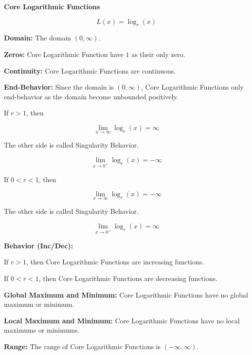 \documentclass{ximera}
\begin{document}
\begin{explanation} \textbf{\textcolor{red!75!green}{Core Logarithmic Functions}} 


\[ L(x) = \log_r(x)  \]



\textbf{Domain:} The domain $(0, \infty)$.

\textbf{Zeros:} Core Logarithmic Function have $1$ as their only zero.



\textbf{Continuity:} Core Logarithmic Functions are continuous.



\textbf{End-Behavior:} Since the domain is $(0, \infty)$, Core Logarithmic Functions only end-behavior as the domain become unbounded positively.


If $r > 1$, then

\[
\lim\limits_{x \to \infty} \log_r(x) = \infty
\]


The other side is called Singularity Behavior.

\[
\lim\limits_{x \to 0^+} \log_r(x) = -\infty
\]





If $0 < r < 1$, then

\[
\lim\limits_{x \to \infty} \log_r(x) = -\infty
\]


The other side is called Singularity Behavior.

\[
\lim\limits_{x \to 0^+} \log_r(x) = \infty
\]







\textbf{Behavior (Inc/Dec):} 




If $r > 1$, then Core Logarithmic Functions are increasing functions.


If $0 < r < 1$, then Core Logarithmic Functions are decreasing functions.





\textbf{Global Maximum and Minimum:} Core Logarithmic Functions have no global maximum or minimum.

\textbf{Local Maximum and Minimum:}  Core Logarithmic Functions have no local maximums or minimums.

\textbf{Range:} The range of Core Logarithmic Functions is $(-\infty,\infty)$.

\end{explanation}
\end{document}
